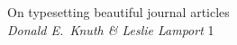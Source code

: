\documentclass[prelims]{../jciartcl}
\begin{document}
\maketitle

\makecontents

\begin{contents}
	\item On typesetting beautiful journal articles\\
		\textit{Donald E.\ Knuth \& Leslie Lamport}
		\hfill 1
\end{contents}
\end{document}
